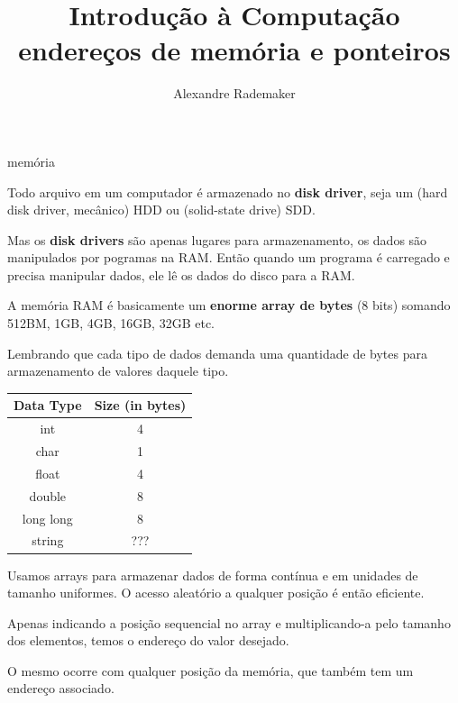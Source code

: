 \documentclass{beamer}
\title{Introdução à Computação \\ endereços de memória e ponteiros}
\author{Alexandre Rademaker}
\date{}
\begin{document}
\begin{frame}
 \maketitle
\end{frame}


\begin{frame}{memória}

  Todo arquivo em um computador é armazenado no \textbf{disk driver},
  seja um (hard disk driver, mecânico) HDD ou (solid-state drive)
  SDD.

  Mas os \textbf{disk drivers} são apenas lugares para armazenamento,
  os dados são manipulados por pogramas na RAM. Então quando um
  programa é carregado e precisa manipular dados, ele lê os dados do
  disco para a RAM.

  A memória RAM é basicamente um \textbf{enorme array de bytes} (8
  bits) somando 512BM, 1GB, 4GB, 16GB, 32GB etc.
  
  \framebreak

  Lembrando que cada tipo de dados demanda uma quantidade de bytes
  para armazenamento de valores daquele tipo.

  \begin{center}
    \begin{tabular}{cc}
      \hline
      Data Type & Size (in bytes)\\
      \hline
      int & 4\\
      char & 1\\
      float & 4\\
      double & 8\\
      long long & 8\\
      string & {\color{red} ???}\\
      \hline
    \end{tabular}
  \end{center}

  \framebreak

  Usamos arrays para armazenar dados de forma contínua e em unidades
  de tamanho uniformes. O acesso aleatório a qualquer posição é então
  eficiente.

  Apenas indicando a posição sequencial no array e multiplicando-a
  pelo tamanho dos elementos, temos o endereço do valor desejado.

  O mesmo ocorre com qualquer posição da memória, que também tem um
  endereço associado.

  \framebreak


\end{frame}
\end{document}
